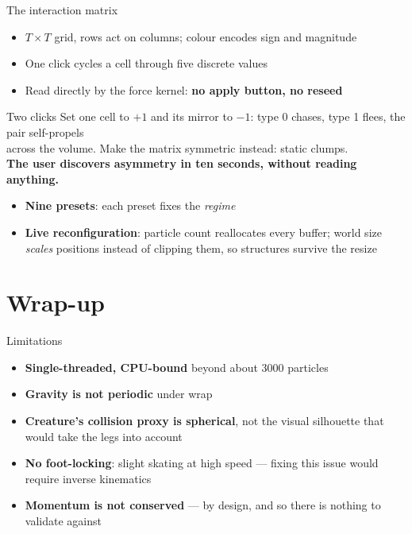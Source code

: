 \documentclass[10pt]{beamer}
\begin{document}
\begin{frame}{The interaction matrix}
	\begin{itemize}
		\item $T \times T$ grid, rows act on columns; colour encodes sign and magnitude
		\item One click cycles a cell through five discrete values
		\item Read directly by the force kernel: \textbf{no apply button, no reseed}
	\end{itemize}
	\begin{block}{Two clicks}
		\centering Set one cell to $+1$ and its mirror to $-1$: type 0 chases, type 1 flees, the pair self-propels \\ across the volume. Make the matrix symmetric instead: static clumps. \\
		\textbf{The user discovers asymmetry in ten seconds, without reading anything.}
	\end{block}
	\begin{itemize}\small
		\item \textbf{Nine presets}: each preset fixes the \emph{regime}
		\item \textbf{Live reconfiguration}: particle count reallocates every buffer; world size \emph{scales}
		      positions instead of clipping them, so structures survive the resize
	\end{itemize}
\end{frame}

\section{Wrap-up}

\begin{frame}{Limitations}
	\begin{itemize}
		\item \textbf{Single-threaded, CPU-bound} beyond about 3000 particles\\
		\item \textbf{Gravity is not periodic} under wrap
		\item \textbf{Creature's collision proxy is spherical}, not the visual silhouette that would take the legs into account
		\item \textbf{No foot-locking}: slight skating at high speed --- fixing this issue would require inverse kinematics
		\item \textbf{Momentum is not conserved} --- by design, and so there is nothing to validate against
	\end{itemize}
\end{frame}
\end{document}
